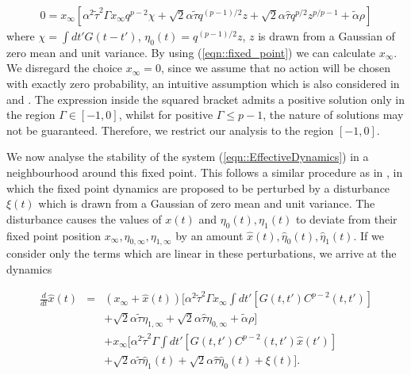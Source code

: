 \documentclass[sigconf,anonymous]{aamas}
\newcommand{\talpha}{\tilde{\alpha}}
\newcommand{\ttau}{\tilde{\tau}}
\newcommand{\htau}{\hat{\tau}}
\newcommand{\xfixed}{x_\infty}
\newcommand{\ezerof}{\eta_{0, \infty}}
\newcommand{\eonef}{\eta_{1, \infty}}
\newcommand{\xpert}{\hat{x}(t)}
\newcommand{\xpertdash}{\hat{x}(t')}
\newcommand{\ezeropert}{\hat{\eta}_0(t)}
\newcommand{\eonepert}{\hat{\eta}_1(t)}
\begin{document}
\small{
\begin{eqnarray}
    0  = \xfixed [ \alpha^2 \ttau^2 \Gamma \xfixed q^{p-2} \chi + \sqrt{2} \alpha \ttau q^{(p-1)/2}z + \sqrt{2} \alpha \htau q^{p/2} z^{p/p-1} + \talpha \rho]
    \label{eqn::fixed_point}
\end{eqnarray}
}
%
where $\chi = \int dt' G(t - t')$, $\eta_0(t) = q^{(p-1)/2}z$, $z$ is
drawn from a Gaussian of zero mean and unit variance. By using (\ref{eqn::fixed_point}) we can
calculate $\xfixed$. We disregard the choice $\xfixed = 0$, since we
assume that no action will be chosen with exactly zero probability, an
intuitive assumption which is also considered in \cite{Sanders2018}
and \cite{Coolen2005}. The expression inside the squared bracket
admits a positive solution only in the region $\Gamma \in [-1, 0]$,
whilst for positive $\Gamma \leq p-1$, the nature of solutions may
not be guaranteed. Therefore, we restrict our analysis to the region
$[-1, 0]$.

We now analyse the stability of the system (\ref{eqn::EffectiveDynamics}) in a neighbourhood around
this fixed point. This follows a similar procedure as in \cite{Opper1992}, in
which the fixed point dynamics are proposed to be perturbed by a
disturbance $\xi(t)$ which is drawn from a Gaussian of zero mean and
unit variance. The disturbance causes the values of $x(t)$ and
$\eta_0(t), \eta_1(t)$ to deviate from their fixed point position
$\xfixed, \ezerof, \eonef$ by an amount $\xpert, \ezeropert,
\eonepert$.  If we consider only the terms which are linear in these
perturbations, we arrive at the dynamics

\begin{eqnarray}
\frac{d}{dt} \xpert & = & (\xfixed + \xpert) [ \alpha^2 \ttau^2 \Gamma \xfixed \int dt' [ G(t, t')C^{p - 2}(t, t') ] \nonumber \\
  & & + \sqrt{2} \alpha \ttau \eonef + \sqrt{2} \alpha \htau \ezerof + \talpha \rho] \nonumber \\
& &  + \xfixed [\alpha^2 \ttau^2 \Gamma \int dt' [ G(t, t')C^{p - 2}(t, t') \xpertdash ] \nonumber \\
  & & + \sqrt{2} \alpha \ttau \eonepert + \sqrt{2} \alpha \htau \ezeropert + \xi(t)].
\label{eqn::Linearised}
\end{eqnarray}
\end{document}
